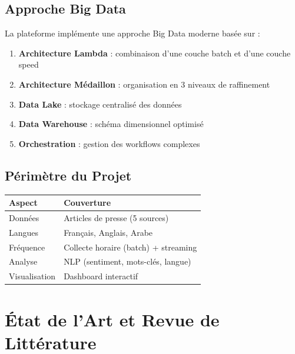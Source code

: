 \documentclass[12pt,a4paper]{report}
\begin{document}
\section{Approche Big Data}

La plateforme implémente une approche Big Data moderne basée sur :

\begin{enumerate}
    \item \textbf{Architecture Lambda} : combinaison d'une couche batch et d'une couche speed
    \item \textbf{Architecture Médaillon} : organisation en 3 niveaux de raffinement
    \item \textbf{Data Lake} : stockage centralisé des données
    \item \textbf{Data Warehouse} : schéma dimensionnel optimisé
    \item \textbf{Orchestration} : gestion des workflows complexes
\end{enumerate}

\section{Périmètre du Projet}

\begin{table}[H]
    \centering
    \begin{tabular}{ll}
        \toprule
        \textbf{Aspect} & \textbf{Couverture}                  \\
        \midrule
        Données         & Articles de presse (5 sources)       \\
        Langues         & Français, Anglais, Arabe             \\
        Fréquence       & Collecte horaire (batch) + streaming \\
        Analyse         & NLP (sentiment, mots-clés, langue)   \\
        Visualisation   & Dashboard interactif                 \\
        \bottomrule
    \end{tabular}
\end{table}


\chapter{État de l'Art et Revue de Littérature}
\end{document}
